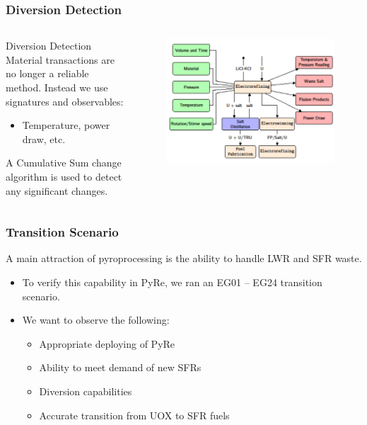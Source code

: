 \begin{frame}
\frametitle{Diversion Detection}
\begin{columns}
	\column[t]{5cm}
	\begin{block}{Diversion Detection}
		Material transactions are no longer a reliable method. Instead we use
		signatures and observables:
		\begin{itemize}
			\item Temperature, power draw, etc.
		\end{itemize}
		A Cumulative Sum change algorithm is used to detect any significant changes.
	\end{block}
	\column[t]{6cm}
	\begin{figure}
		\includegraphics[width=\linewidth]{images/refining}
	\end{figure}
\end{columns}
\end{frame}

\begin{frame}
\frametitle{Transition Scenario}
A main attraction of pyroprocessing is the ability to handle LWR and
SFR waste.
\begin{itemize}
	\item To verify this capability in PyRe, we ran an EG01 – EG24 transition
	scenario.
	\item We want to observe the following:
	\begin{itemize}
		\item Appropriate deploying of PyRe
		\item Ability to meet demand of new SFRs
		\item Diversion capabilities
		\item Accurate transition from UOX to SFR fuels
	\end{itemize}
\end{itemize}
\end{frame}

